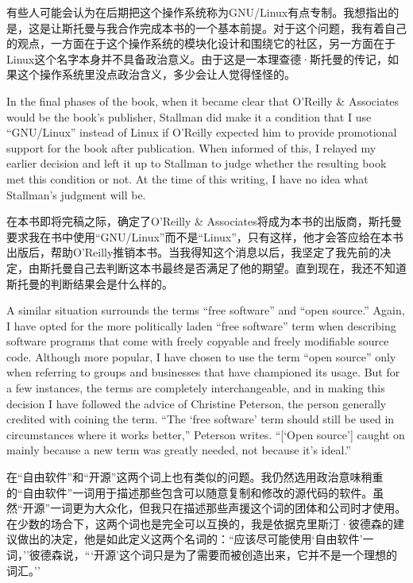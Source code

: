 \ifdefined\chs
有些人可能会认为在后期把这个操作系统称为GNU/Linux有点专制。我想指出的是，这是让斯托曼与我合作完成本书的一个基本前提。对于这个问题，我有着自己的观点，一方面在于这个操作系统的模块化设计和围绕它的社区，另一方面在于Linux这个名字本身并不具备政治意义。由于这是一本理查德·斯托曼的传记，如果这个操作系统里没点政治含义，多少会让人觉得怪怪的。
\fi

\ifdefined\eng
In the final phases of the book, when it became clear that O'Reilly \& Associates would be the book's publisher, Stallman did make it a condition that I use ``GNU/Linux'' instead of Linux if O'Reilly expected him to provide promotional support for the book after publication. When informed of this, I relayed my earlier decision and left it up to Stallman to judge whether the resulting book met this condition or not. At the time of this writing, I have no idea what Stallman's judgment will be.
\fi

\ifdefined\chs
在本书即将完稿之际，确定了O'Reilly \& Associates将成为本书的出版商，斯托曼要求我在书中使用``GNU/Linux''而不是``Linux''，只有这样，他才会答应给在本书出版后，帮助O'Reilly推销本书。当我得知这个消息以后，我坚定了我先前的决定，由斯托曼自己去判断这本书最终是否满足了他的期望。直到现在，我还不知道斯托曼的判断结果会是什么样的。
\fi

\ifdefined\eng
A similar situation surrounds the terms ``free software'' and ``open source.'' Again, I have opted for the more politically laden ``free software'' term when describing software programs that come with freely copyable and freely modifiable source code. Although more popular, I have chosen to use the term ``open source'' only when referring to groups and businesses that have championed its usage. But for a few instances, the terms are completely interchangeable, and in making this decision I have followed the advice of Christine Peterson, the person generally credited with coining the term. ``The `free software' term should still be used in circumstances where it works better,'' Peterson writes. ``[`Open source'] caught on mainly because a new term was greatly needed, not because it's ideal.''
\fi

\ifdefined\chs
在``自由软件''和``开源''这两个词上也有类似的问题。我仍然选用政治意味稍重的``自由软件''一词用于描述那些包含可以随意复制和修改的源代码的软件。虽然``开源''一词更为大众化，但我只在描述那些声援这个词的团体和公司时才使用。在少数的场合下，这两个词也是完全可以互换的，我是依据克里斯汀·彼德森的建议做出的决定，他是如此定义这两个名词的：``应该尽可能使用`自由软件'一词，''彼德森说，```开源'这个词只是为了需要而被创造出来，它并不是一个理想的词汇。''
\fi

\setcounter{endnote}{0}
